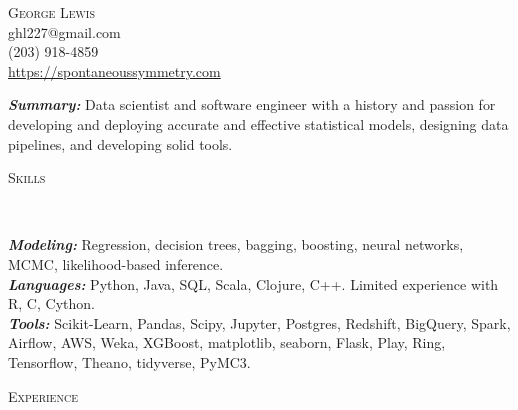 \documentclass[9pt]{article}
\newenvironment{changemargin}[2]{%
  \begin{list}{}{%
    \setlength{\topsep}{0pt}%
    \setlength{\leftmargin}{#1}%
    \setlength{\rightmargin}{#2}%
    \setlength{\listparindent}{\parindent}%
    \setlength{\itemindent}{\parindent}%
    \setlength{\parsep}{\parskip}%
  }%
  \item[]}{\end{list}
}
\newcommand{\lineover}{
  \begin{changemargin}{-0.05in}{-0.05in}
    \vspace*{-8pt}
    \hrulefill \\
    \vspace*{-2pt}
  \end{changemargin}
}
\newcommand{\header}[1]{
  \begin{changemargin}{-0.5in}{-0.5in}
    \scshape{#1}\\
    \lineover
  \end{changemargin}
}
\newcommand{\contact}[4]{
  \begin{changemargin}{-0.5in}{-0.5in}
    \begin{center}
      {\Large \scshape {#1}}\\ \smallskip
      {#2}\\ \smallskip
      {#3}\\ \smallskip
      {#4}\smallskip
    \end{center}
  \end{changemargin}
}
\newenvironment{body} {
  \vspace*{-16pt}
\begin{changemargin}{-0.25in}{-0.5in}
  }
{\end{changemargin}
}
\begin{document}
\contact{George Lewis}
        {ghl227@gmail.com}
        {(203) 918-4859}
        {\url{https://spontaneoussymmetry.com}}
\smallskip

\begin{body}
  \vspace{14pt}
  \emph{\textbf{Summary:}}{} Data scientist and software engineer with a history and passion for developing and deploying accurate and effective statistical models, designing data pipelines, and developing solid tools. %


\end{body}

\smallskip

\header{Skills}
\begin{body}
  \vspace{14pt}
  \emph{\textbf{Modeling:}}{} Regression, decision trees, bagging, boosting, neural networks, MCMC, likelihood-based inference. \\
  \emph{\textbf{Languages:}}{} Python, Java, SQL, Scala, Clojure, C++.  Limited experience with R, C, Cython. \\
  \smallskip
  \emph{\textbf{Tools:}}{} Scikit-Learn, Pandas, Scipy, Jupyter, Postgres, Redshift, BigQuery, Spark, Airflow, AWS, Weka, XGBoost, matplotlib, seaborn, Flask, Play, Ring,  Tensorflow, Theano, tidyverse, PyMC3.  \\
\end{body}

\smallskip

\header{Experience}
\end{document}
